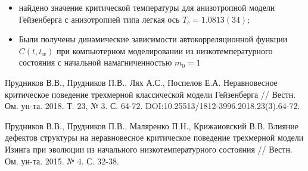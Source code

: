 \documentclass[a4paper,14pt]{extarticle}
\begin{document}
\begin{itemize}
\item найдено значение критической температуры для анизотропной модели Гейзенберга с анизотропией типа легкая ось $T_c=1.0813(34)$;

\item Были получены динамические зависимости автокорреляционной функции $C(t,t_w)$ при компьютерном моделировании из низкотемпературного состояния с начальной намагниченностью $m_0 = 1$
\end{itemize}
\newpage
\begin{thebibliography}{99} 

Прудников В.В., Прудников П.В., Лях А.С., Поспелов Е.А. Неравновесное критическое поведение трехмерной классической модели Гейзенберга // Вестн. Ом. ун-та. 2018. Т. 23, № 3. С. 64-72. DOI:10.25513/1812-3996.2018.23(3).64-72. 

Прудников В.В., Прудников П.В., Маляренко П.Н., Крижановский В.В. Влияние дефектов структуры на неравновесное критическое поведение трехмерной модели Изинга при эволюции из начального низкотемпературного состояния // Вестн. Ом. ун-та. 2015. № 4. С. 32-38. 


\end{thebibliography}
\end{document}

